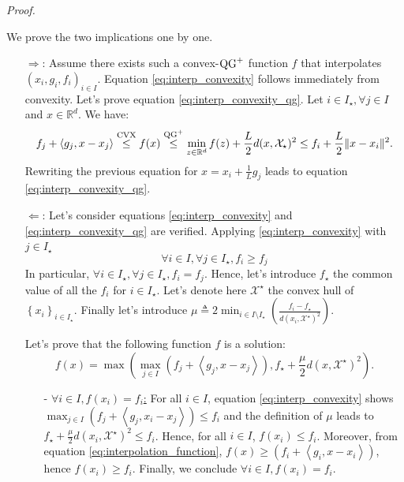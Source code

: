 \interpolationconditions*

\noindent \textit{Proof.}
    
    We prove the two implications one by one.
    
    \begin{itemize}
        \item[$\Rightarrow$:] Assume there exists such a convex-$\operatorname{QG}^+$ function $f$ that interpolates $(x_i, g_i, f_i)_{i \in I}$. Equation \eqref{eq:interp_convexity} follows immediately from convexity. Let's prove equation \eqref{eq:interp_convexity_qg}. Let $i \in I_\star, \forall j \in I$ and $x \in \mathbb{R}^d$. We have:
        \begin{equation*}
            f_j + \left< g_j, x - x_j \right> \overset{\text{CVX}}{\leq} f(x) \overset{\operatorname{QG}^+}{\leq} \min_{z \in \mathbb{R}^d} f(z) + \frac{L}{2}d(x, \mathcal{X}_\star)^2 \leq f_i + \frac{L}{2}\|x - x_i \|^2.
        \end{equation*}
        Rewriting the previous equation for $x = x_i + \frac{1}{L}g_j$ leads to equation \eqref{eq:interp_convexity_qg}.
        
        \item[$\Leftarrow$:] Let's consider equations \eqref{eq:interp_convexity} and \eqref{eq:interp_convexity_qg} are verified.
        Applying \eqref{eq:interp_convexity} with $j \in I_\star$
        \begin{equation}
            \forall i \in I, \forall j \in I_\star, f_i \geq f_j \label{eq:stationary_are_minima}
        \end{equation}
        In particular, $\forall i \in I_\star, \forall j \in I_\star, f_i = f_j$.
        Hence, let's introduce $f_\star$ the common value of all the $f_i$ for $i \in I_\star$. Let's denote here $\mathcal{X}^\star$ the convex hull of $\left\{x_i\right\}_{i \in I_\star}$.
        Finally let's introduce $\mu \triangleq 2 \min_{i \in I \setminus I_\star} \left( \frac{f_i - f_\star}{d(x_i, \mathcal{X}^\star)^2} \right)$.
        
        Let's prove that the following function $f$ is a solution:
        \begin{equation}
            f(x) = \max\left( \max_{j \in I} \left( f_j + \left< g_j, x - x_j \right> \right), f_\star + \frac{\mu}{2}d\left(x, \mathcal{X}^\star \right)^2 \right).
            \label{eq:interpolation_function}
        \end{equation}
        
        \begin{itemize}
            \item[-]\underline{$\forall i \in I, f(x_i) = f_i$:} For all $i \in I$, equation \eqref{eq:interp_convexity} shows $\max_{j \in I} \left( f_j + \left< g_j, x_i - x_j \right> \right) \leq f_i$ and the definition of $\mu$ leads to $f_\star + \frac{\mu}{2}d\left(x_i, \mathcal{X}^\star \right)^2 \leq f_i$. Hence, for all $i \in I$, $f(x_i) \leq f_i$.
            Moreover, from equation \eqref{eq:interpolation_function}, $f(x) \geq \left( f_i + \left< g_i, x - x_i \right> \right)$, hence $f(x_i) \geq f_i$.
            Finally, we conclude $\forall i \in I, f(x_i) = f_i$.
            

\end{itemize}
\end{itemize}
